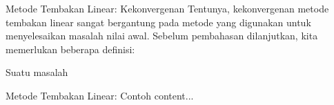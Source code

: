 \documentclass[xcolor={dvipsnames}, 9pt]{beamer}
\renewcommand{\emph}[1]{\textcolor{Blue}{#1}}
\begin{document}
    \begin{frame}{Metode Tembakan Linear: Kekonvergenan}
    	Tentunya, kekonvergenan metode tembakan linear sangat bergantung pada metode yang digunakan untuk menyelesaikan masalah nilai awal. Sebelum pembahasan dilanjutkan, kita memerlukan beberapa definisi:
    	\begin{definition}
    		Suatu masalah 
    	\end{definition}
    \end{frame}
    \begin{frame}{Metode Tembakan Linear: Contoh}
    	content...
    \end{frame}
\end{document}
